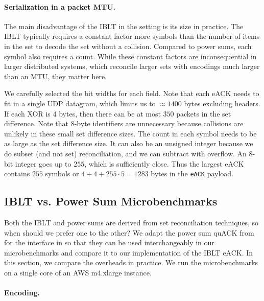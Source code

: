 \paragraph{Serialization in a packet MTU.} The main disadvantage of the IBLT in
 the \Sys setting is its size in practice. The IBLT typically requires a constant factor
 more symbols than the number of items in the set to decode the set without a
 collision. Compared to power sums, each symbol also requires a count. While
 these constant factors are inconsequential in larger distributed systems,
 which reconcile larger sets with encodings much larger than an MTU, they
 matter here.

We carefully selected the bit widths for each field. Note that each eACK needs
to fit in a single UDP datagram, which limits us to $\approx\!1400$ bytes
excluding headers. If each XOR is $4$ bytes, then there can be at most $350$
packets in the set difference. Note that $8$-byte identifiers are unnecessary
because collisions are unlikely in these small set difference sizes. The count
in each symbol needs to be as large as the set difference size. It can also be
an unsigned integer because we do subset (and not set) reconciliation, and we
can subtract with overflow. An 8-bit integer goes up to $255$, which is
sufficiently close. Thus the largest eACK contains $255$ symbols or $4 +
4 + 255 \cdot 5 = 1283$ bytes in the \texttt{eACK} payload.


\subsection{IBLT vs. Power Sum Microbenchmarks}
\label{sec:eack:microbenchmarks}

Both the IBLT and power sums are derived from set reconciliation
techniques, so when should we prefer one to the other?
We adapt the power sum quACK from \cite{yuan2024sidekick} for the interface
in 
so that they can be used interchangeably in our microbenchmarks and compare
it to our implementation of the IBLT eACK.
In this section, we compare the overheads in practice.
We run the microbenchmarks on a single core of an AWS m4.xlarge instance.

\paragraph{Encoding.}

